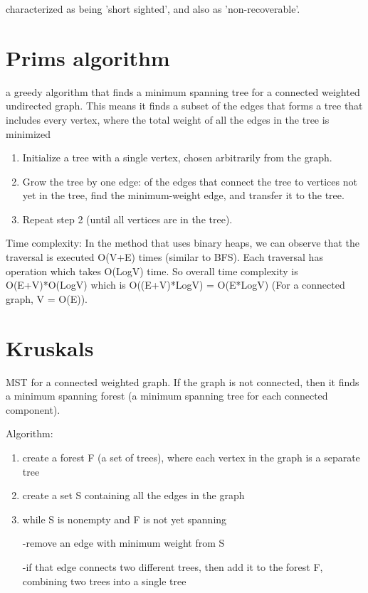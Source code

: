 \documentclass[10 pt]{article}
\begin{document}
characterized as being 'short sighted', and also as 'non-recoverable'. 

\section{Prims algorithm}
a greedy algorithm that finds a minimum spanning tree for a connected weighted undirected graph. This means it finds a subset of the edges that forms a tree that includes every vertex, where the total weight of all the edges in the tree is minimized
\begin{enumerate}
\item Initialize a tree with a single vertex, chosen arbitrarily from the graph.
\item Grow the tree by one edge: of the edges that connect the tree to vertices not yet in the tree, find the minimum-weight edge, and transfer it to the tree.
\item Repeat step 2 (until all vertices are in the tree).

\end{enumerate}

Time complexity:
In the method that uses binary heaps, we can observe that the traversal is executed O(V+E) times (similar to BFS). Each traversal has operation which takes O(LogV) time. So overall time complexity is O(E+V)*O(LogV) which is O((E+V)*LogV) = O(E*LogV) (For a connected graph, V = O(E)).

\section{Kruskals}
MST for a connected weighted graph. If the graph is not connected, then it finds a minimum spanning forest (a minimum spanning tree for each connected component).

Algorithm:
\begin{enumerate}
\item create a forest F (a set of trees), where each vertex in the graph is a separate tree
\item create a set S containing all the edges in the graph
\item while S is nonempty and F is not yet spanning
    
    -remove an edge with minimum weight from S
    
    -if that edge connects two different trees, then add it to the forest F, combining two trees into a single tree
\end{enumerate}
\end{document}
